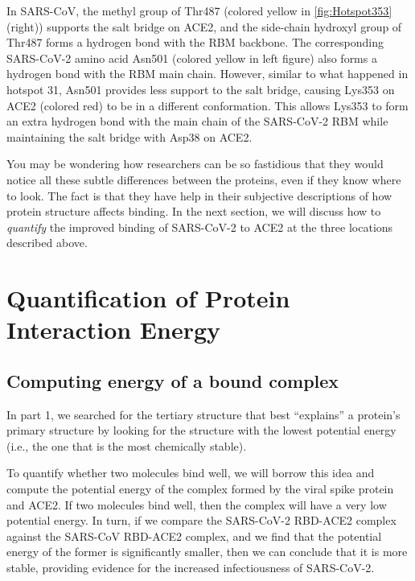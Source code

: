 In SARS-CoV, the methyl group of Thr487 (colored yellow in \autoref{fig:Hotspot353} (right)) supports the salt bridge on ACE2, and the side-chain hydroxyl group of Thr487 forms a hydrogen bond with the RBM backbone. The corresponding SARS-CoV-2 amino acid Asn501 (colored yellow in left figure) also forms a hydrogen bond with the RBM main chain. However, similar to what happened in hotspot 31, Asn501 provides less support to the salt bridge, causing Lys353 on ACE2 (colored red) to be in a different conformation. This allows Lys353 to form an extra hydrogen bond with the main chain of the SARS-CoV-2 RBM while maintaining the salt bridge with Asp38 on ACE2.

You may be wondering how researchers can be so fastidious that they would notice all these subtle differences between the proteins, even if they know where to look. The fact is that they have help in their subjective descriptions of how protein structure affects binding. In the next section, we will discuss how to \textit{quantify} the improved binding of SARS-CoV-2 to ACE2 at the three locations described above.\\

\FloatBarrier
{}

\section{Quantification of Protein Interaction Energy}
\label{sec:interaction_energy}
\subsection{Computing energy of a bound complex}

In part 1, we searched for the tertiary structure that best ``explains'' a protein's primary structure by looking for the structure with the lowest potential energy (i.e., the one that is the most chemically stable).

To quantify whether two molecules bind well, we will borrow this idea and compute the potential energy of the complex formed by the viral spike protein and ACE2. If two molecules bind well, then the complex will have a very low potential energy. In turn, if we compare the SARS-CoV-2 RBD-ACE2 complex against the SARS-CoV RBD-ACE2 complex, and we find that the potential energy of the former is significantly smaller, then we can conclude that it is more stable, providing evidence for the increased infectiousness of SARS-CoV-2.

